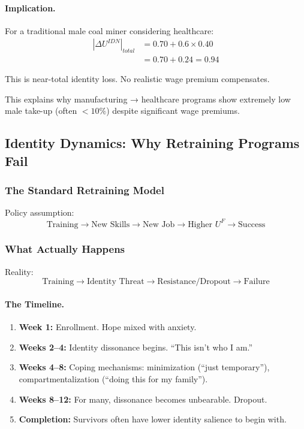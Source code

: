 \paragraph{Implication.}
For a traditional male coal miner considering healthcare:
\begin{align}
|\Delta U^{IDN}|_{total} &= 0.70 + 0.6 \times 0.40 \nonumber \\
&= 0.70 + 0.24 = 0.94
\end{align}

This is near-total identity loss. No realistic wage premium compensates.

This explains why manufacturing → healthcare programs show extremely 
low male take-up (often $<10\%$) despite significant wage premiums.

\subsection{Identity Dynamics: Why Retraining Programs Fail}

\subsubsection{The Standard Retraining Model}

Policy assumption:
\begin{equation}
\text{Training} \to \text{New Skills} \to \text{New Job} \to \text{Higher } U^F \to \text{Success}
\end{equation}

\subsubsection{What Actually Happens}

Reality:
\begin{equation}
\text{Training} \to \text{Identity Threat} \to \text{Resistance/Dropout} \to \text{Failure}
\end{equation}

\paragraph{The Timeline.}
\begin{enumerate}
    \item \textbf{Week 1:} Enrollment. Hope mixed with anxiety.
    \item \textbf{Weeks 2--4:} Identity dissonance begins. ``This isn't who I am.''
    \item \textbf{Weeks 4--8:} Coping mechanisms: minimization (``just temporary''), 
    compartmentalization (``doing this for my family'').
    \item \textbf{Weeks 8--12:} For many, dissonance becomes unbearable. Dropout.
    \item \textbf{Completion:} Survivors often have lower identity salience to begin with.
\end{enumerate}

